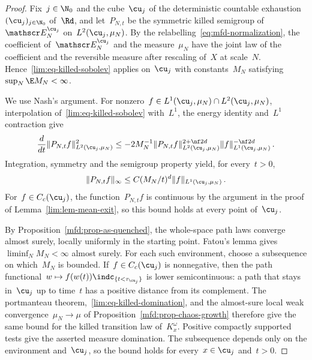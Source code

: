 \documentclass[11pt]{amsart}
\begin{document}
\begin{proof}
Fix~$j\in\N_0$ and the cube~$\cu_j$ of the deterministic countable exhaustion~$(\cu_j)_{j\in\N_0}$ of~$\Rd$, and let~$P_{N,t}$ be the symmetric killed semigroup of~$\mathscr E_N^{\cu_j}$ on~$L^2(\cu_j,\mu_N)$. By the relabelling~\eqref{eq:mfd-normalization}, the coefficient of~$\mathscr E_N^{\cu_j}$ and the measure~$\mu_N$ have the joint law of the coefficient and the reversible measure after rescaling of~$X$ at scale~$N$. Hence~\eqref{lim:eq-killed-sobolev} applies on~$\cu_j$ with constants~$M_N$ satisfying~$\sup_N\E M_N<\infty$.

\smallskip

We use Nash's argument. For nonzero~$f\in L^1(\cu_j,\mu_N)\cap L^2(\cu_j,\mu_N)$, interpolation of~\eqref{lim:eq-killed-sobolev} with~$L^1$, the energy identity and~$L^1$ contraction give
\begin{equation*}
	\frac d{dt}\|P_{N,t}f\|_{L^2(\cu_j,\mu_N)}^2
	\leq-2M_N^{-1}\|P_{N,t}f\|_{L^2(\cu_j,\mu_N)}^{2+\nf2d}
	\|f\|_{L^1(\cu_j,\mu_N)}^{-\nf2d}\,.
\end{equation*}
Integration, symmetry and the semigroup property yield, for every~$t>0$,
\begin{equation}
	\|P_{N,t}f\|_\infty
	\leq C(M_N/t)^d\|f\|_{L^1(\cu_j,\mu_N)}\,.
	\label{lim:eq-killed-domination}
\end{equation}
For~$f\in C_c(\cu_j)$, the function~$P_{N,t}f$ is continuous by the argument in the proof of Lemma~\ref{lim:lem-mean-exit}, so this bound holds at every point of~$\cu_j$.

\smallskip

By Proposition~\ref{mfd:prop-as-quenched}, the whole-space path laws converge almost surely, locally uniformly in the starting point. Fatou's lemma gives~$\liminf_N M_N<\infty$ almost surely. For each such environment, choose a subsequence on which~$M_N$ is bounded. If~$f\in C_c(\cu_j)$ is nonnegative, then the path functional~$w\mapsto f(w(t))\indc_{\{t<\tau_{\cu_j}\}}$ is lower semicontinuous: a path that stays in~$\cu_j$ up to time~$t$ has a positive distance from its complement. The portmanteau theorem,~\eqref{lim:eq-killed-domination}, and the almost-sure local weak convergence~$\mu_N\to\mu$ of Proposition~\ref{mfd:prop-chaos-growth} therefore give the same bound for the killed transition law of~$K^\omega_x$. Positive compactly supported tests give the asserted measure domination. The subsequence depends only on the environment and~$\cu_j$, so the bound holds for every~$x\in\cu_j$ and~$t>0$.


\end{proof}
\end{document}
